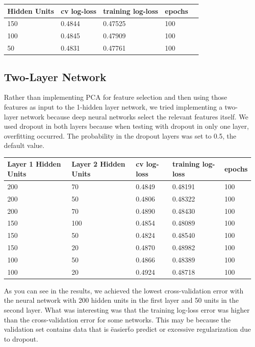\documentclass[twoside,11pt]{article}
\theoremstyle{definition}
\begin{document}
      \begin{center}
          \begin{tabular}{ | l | l | l | l | p{5cm} |}
          \hline
          Hidden Units & cv log-loss & training log-loss & epochs \\ \hline
          150 & 0.4844 & 0.47525 & 100 \\ \hline
          100 & 0.4845 & 0.47909 & 100 \\ \hline
          50 & 0.4831 & 0.47761 & 100 \\ \hline 
          \end{tabular}
      \end{center}

\subsection{Two-Layer Network}
Rather than implementing PCA for feature selection and then using those features as input to the 1-hidden layer network, we tried implementing a two-layer network because deep neural networks select the relevant features itself. We used dropout in both layers because when testing with dropout in only one layer, overfitting occurred. The probability in the dropout layers was set to 0.5, the default value. 

      \begin{center}
          \begin{tabular}{ | l | l | l | l | p{5cm} |}
          \hline
          Layer 1 Hidden Units & Layer 2 Hidden Units & cv log-loss & training log-loss & epochs \\ \hline
          200 & 70 & 0.4849 & 0.48191 & 100 \\ \hline
          200 & 50 & 0.4806 & 0.48322 & 100 \\ \hline
          200 & 70 & 0.4890 & 0.48430 & 100 \\ \hline
          150 & 100 & 0.4854 & 0.48089 & 100 \\ \hline
          150 & 50 & 0.4824 & 0.48540 & 100 \\ \hline
          150 & 20 & 0.4870 & 0.48982 & 100 \\ \hline
          100 & 50 & 0.4866 & 0.48389 & 100 \\ \hline
          100 & 20 & 0.4924 & 0.48718 & 100 \\ \hline
          \end{tabular}
      \end{center}

As you can see in the results, we achieved the lowest cross-validation error with the neural network with 200 hidden units in the first layer and 50 units in the second layer. What was interesting was that the training log-loss error was higher than the cross-validation error for some networks. This may be because the validation set contains data that is \"easier\" to predict or excessive regularization due to dropout. 
\end{document}
